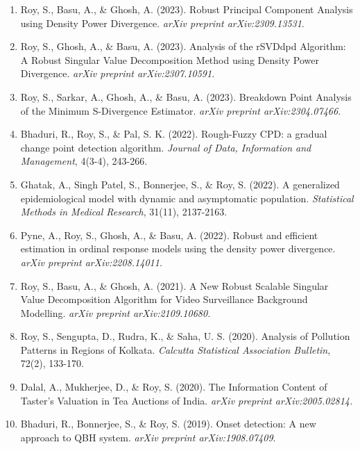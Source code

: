 \documentclass[9pt]{developercv} %
\begin{document}

\begin{minipage}{\textwidth}
    \small
    \begin{enumerate}
        \item Roy, S., Basu, A., \& Ghosh, A. (2023). Robust Principal Component Analysis using Density Power Divergence. \textit{arXiv preprint arXiv:2309.13531}.
        \item Roy, S., Ghosh, A., \& Basu, A. (2023). Analysis of the rSVDdpd Algorithm: A Robust Singular Value Decomposition Method using Density Power Divergence. \textit{arXiv preprint arXiv:2307.10591}.
        \item Roy, S., Sarkar, A., Ghosh, A., \& Basu, A. (2023). Breakdown Point Analysis of the Minimum S-Divergence Estimator. \textit{arXiv preprint arXiv:2304.07466.}
        \item Bhaduri, R., Roy, S., \& Pal, S. K. (2022). Rough-Fuzzy CPD: a gradual change point detection algorithm. \textit{Journal of Data, Information and Management}, 4(3-4), 243-266.
        \item Ghatak, A., Singh Patel, S., Bonnerjee, S., \& Roy, S. (2022). A generalized epidemiological model with dynamic and asymptomatic population. \textit{Statistical Methods in Medical Research}, 31(11), 2137-2163.
        \item Pyne, A., Roy, S., Ghosh, A., \& Basu, A. (2022). Robust and efficient estimation in ordinal response models using the density power divergence. \textit{arXiv preprint arXiv:2208.14011.}
        \item Roy, S., Basu, A., \& Ghosh, A. (2021). A New Robust Scalable Singular Value Decomposition Algorithm for Video Surveillance Background Modelling. \textit{arXiv preprint arXiv:2109.10680.}
        \item Roy, S., Sengupta, D., Rudra, K., \& Saha, U. S. (2020). Analysis of Pollution Patterns in Regions of Kolkata. \textit{Calcutta Statistical Association Bulletin}, 72(2), 133-170.
        \item Dalal, A., Mukherjee, D., \& Roy, S. (2020). The Information Content of Taster's Valuation in Tea Auctions of India. \textit{arXiv preprint arXiv:2005.02814.}
        \item Bhaduri, R., Bonnerjee, S., \& Roy, S. (2019). Onset detection: A new approach to QBH system. \textit{arXiv preprint arXiv:1908.07409}.
    \end{enumerate}        
\end{minipage}
\end{document}
